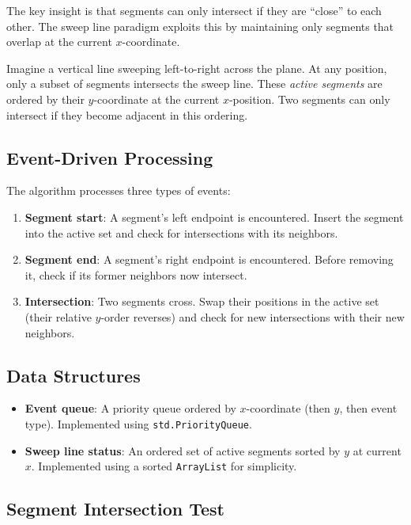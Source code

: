 \documentclass[11pt,a4paper]{article}
\begin{document}
The key insight is that segments can only intersect if they are ``close'' to each other. The sweep line paradigm exploits this by maintaining only segments that overlap at the current $x$-coordinate.

Imagine a vertical line sweeping left-to-right across the plane. At any position, only a subset of segments intersects the sweep line. These \textit{active segments} are ordered by their $y$-coordinate at the current $x$-position. Two segments can only intersect if they become adjacent in this ordering.

\subsection{Event-Driven Processing}

The algorithm processes three types of events:

\begin{enumerate}
    \item \textbf{Segment start}: A segment's left endpoint is encountered. Insert the segment into the active set and check for intersections with its neighbors.

    \item \textbf{Segment end}: A segment's right endpoint is encountered. Before removing it, check if its former neighbors now intersect.

    \item \textbf{Intersection}: Two segments cross. Swap their positions in the active set (their relative $y$-order reverses) and check for new intersections with their new neighbors.
\end{enumerate}

\subsection{Data Structures}

\begin{itemize}
    \item \textbf{Event queue}: A priority queue ordered by $x$-coordinate (then $y$, then event type). Implemented using \texttt{std.PriorityQueue}.

    \item \textbf{Sweep line status}: An ordered set of active segments sorted by $y$ at current $x$. Implemented using a sorted \texttt{ArrayList} for simplicity.
\end{itemize}

\subsection{Segment Intersection Test}
\end{document}

